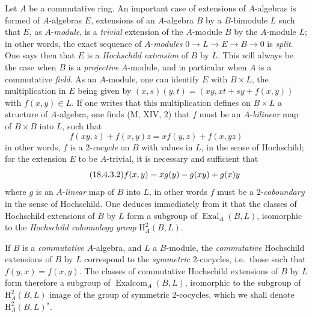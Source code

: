 \begin{env}[18.4.3]
\label{0.18.4.3}
Let $A$ be a commutative ring.
An important case of extensions of $A$-algebras is formed of $A$-algebras $E$, extensions of an $A$-algebra $B$ by a $B$-bimodule $L$ such that $E$, as $A$-\emph{module}, is a \emph{trivial} extension of the $A$-module $B$ by the $A$-module $L$; in other words, the exact sequence of $A$-\emph{modules} $0\to L\to E\to B\to 0$ is \emph{split}.
One says then that $E$ is a \emph{Hochschild extension} of $B$ by $L$.
This will always be the case when $B$ is a \emph{projective} $A$-module, and in particular when $A$ is a commutative \emph{field}.
As an $A$-module, one can identify $E$ with $B\times L$, the multiplication in $E$ being given by $(x,s)(y,t)=(xy,xt+sy+f(x,y))$ with $f(x,y)\in L$.
If one writes that this multiplication defines on $B\times L$ a structure of $A$-algebra, one finds (M, XIV, 2) that $f$ must be an $A$-\emph{bilinear} map of $B\times B$ into $L$, such that
\begin{equation}
\tag{18.4.3.1}
  \label{0.18.4.3.1}
  f(xy,z)+f(x,y)z=xf(y,z)+f(x,yz)
\end{equation}
in other words, $f$ is a $2$-\emph{cocycle} on $B$ with values in $L$, in the sense of Hochschild; for the extension $E$ to be $A$-trivial, it is necessary and sufficient that
\begin{equation}
\tag{18.4.3.2}
  \label{0.18.4.3.2}
  f(x,y)=xg(y)- g(xy)+g(x)y
\end{equation}
where $g$ is an $A$-\emph{linear} map of $B$ into $L$, in other words $f$ must be a $2$-\emph{coboundary} in the sense of Hochschild.
One deduces immediately from it that the classes of Hochschild extensions of $B$ by $L$ form a subgroup of $\operatorname{Exal}_A(B,L)$, isomorphic to the \emph{Hochschild cohomology group} $\mathrm{H}^2_A(B,L)$.

If $B$ is a \emph{commutative} $A$-algebra, and $L$ a $B$-module, the \emph{commutative} Hochschild extensions of $B$ by $L$ correspond to the \emph{symmetric} $2$-cocycles, i.e.\ those such that $f(y,x)=f(x,y)$.
The classes of commutative Hochschild extensions of $B$ by $L$ form therefore a subgroup of $\operatorname{Exalcom}_A(B,L)$, isomorphic to the subgroup of $\mathrm{H}^2_A(B,L)$ image of the group of symmetric $2$-cocycles, which we shall denote $\mathrm{H}^2_A(B,L)^s$.
\end{env}

